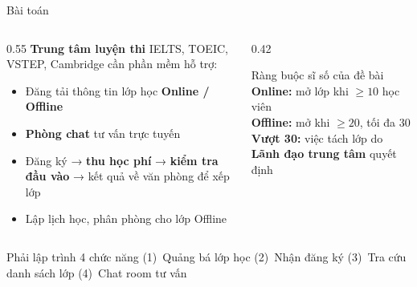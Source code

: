 \documentclass[aspectratio=169,11pt]{beamer}
\begin{document}
\begin{frame}{Bài toán}
  \begin{columns}[T]
    \begin{column}{0.55\linewidth}
      \textbf{Trung tâm luyện thi} IELTS, TOEIC, VSTEP, Cambridge cần phần mềm hỗ trợ:
      \begin{itemize}
        \item Đăng tải thông tin lớp học \textbf{Online / Offline}
        \item \textbf{Phòng chat} tư vấn trực tuyến
        \item Đăng ký → \textbf{thu học phí} → \textbf{kiểm tra đầu vào} → kết quả về văn phòng để xếp lớp
        \item Lập lịch học, phân phòng cho lớp Offline
      \end{itemize}
    \end{column}
    \begin{column}{0.42\linewidth}
      \begin{alertblock}{Ràng buộc sĩ số của đề bài}
        \textbf{Online:} mở lớp khi $\geq 10$ học viên\\[3pt]
        \textbf{Offline:} mở khi $\geq 20$, tối đa 30\\[3pt]
        \textbf{Vượt 30:} việc tách lớp do \textbf{Lãnh đạo trung tâm} quyết định
      \end{alertblock}
    \end{column}
  \end{columns}
  \vspace{6pt}
  \begin{block}{Phải lập trình 4 chức năng}
    \small (1)~Quảng bá lớp học \; (2)~Nhận đăng ký \; (3)~Tra cứu danh sách lớp \; (4)~Chat room tư vấn
  \end{block}
\end{frame}
\end{document}
